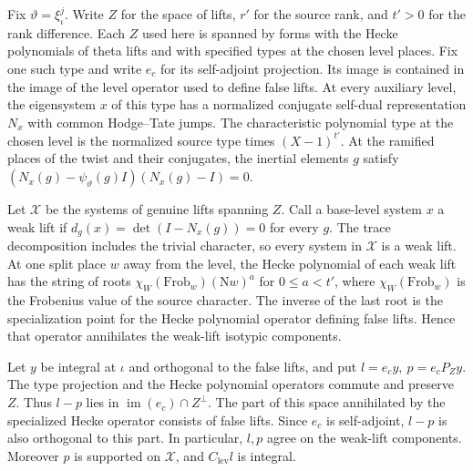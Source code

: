 Fix \(\vartheta=\xi_\iota^j\). Write \(Z\) for the space of lifts,
\(r'\) for the source rank, and \(t'>0\) for the rank difference.
Each \(Z\) used here is spanned by forms with the Hecke polynomials
of theta lifts and with specified types at the chosen level places.
Fix one such type and write \(e_c\) for its self-adjoint projection.
Its image is contained in the image of the level operator used
to define false lifts. At every auxiliary level, the eigensystem
\(x\) of this type has a normalized conjugate self-dual representation
\(N_x\) with common Hodge--Tate jumps. The characteristic polynomial
type at the chosen level is the normalized source type times
\((X-1)^{t'}\). At the ramified places of the twist and their conjugates,
the inertial elements \(g\) satisfy
\((N_x(g)-\psi_\vartheta(g)I)(N_x(g)-I)=0\).

Let \(\mathcal X\) be the systems of genuine lifts spanning \(Z\).
Call a base-level system \(x\) a weak lift if
\(d_g(x)=\det(I-N_x(g))=0\) for every \(g\).
The trace decomposition includes the trivial character, so
every system in \(\mathcal X\) is a weak lift. At one split place
\(w\) away from the level, the Hecke polynomial of each weak lift
has the string of roots \(\chi_W(\mathrm{Frob}_w)(\mathrm Nw)^a\)
for \(0\le a<t'\), where \(\chi_W(\mathrm{Frob}_w)\) is the
Frobenius value of the source character. The inverse of the last
root is the specialization point for the Hecke polynomial
operator defining false lifts. Hence that operator annihilates
the weak-lift isotypic components.

Let \(y\) be integral at \(\iota\) and orthogonal to the false lifts,
and put \(l=e_c y,\ p=e_c P_Z y\). The type projection and the
Hecke polynomial operators commute and preserve \(Z\).
Thus \(l-p\) lies in \(\operatorname{im}(e_c)\cap Z^\perp\).
The part of this space annihilated by the specialized Hecke operator
consists of false lifts. Since \(e_c\) is self-adjoint, \(l-p\) is
also orthogonal to this part. In particular, \(l,p\) agree on
the weak-lift components. Moreover \(p\) is supported on
\(\mathcal X\), and \(C_{\mathrm{lev}}l\) is integral.

